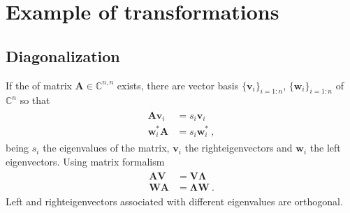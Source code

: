 \documentclass[letterpaper,10pt,english]{jupyterBook}
\begin{document}
\section{Example of transformations}
\label{\detokenize{ch/system-theory/coordinate-transformation:example-of-transformations}}\label{\detokenize{ch/system-theory/coordinate-transformation:system-theory-coordinate-transformation-examples}}

\subsection{Diagonalization}
\label{\detokenize{ch/system-theory/coordinate-transformation:diagonalization}}\label{\detokenize{ch/system-theory/coordinate-transformation:system-theory-coordinate-transformation-examples-diagonalization}}
\sphinxAtStartPar
{} If the  of matrix \(\mathbf{A} \in \mathbb{C}^{n,n}\) exists, there are vector basis \(\{ \mathbf{v}_i \}_{i=1:n}\), \(\{ \mathbf{w}_i \}_{i=1:n}\) of \(\mathbb{C}^n\) so that
\begin{equation*}
\begin{split}\begin{aligned}
  \mathbf{A} \mathbf{v}_i & = s_i \mathbf{v}_i  \\
  \mathbf{w}^*_i \mathbf{A} & = s_i \mathbf{w}^*_i  \ ,
\end{aligned}\end{split}
\end{equation*}
\sphinxAtStartPar
being \(s_i\) the eigenvalues of the matrix, \(\mathbf{v}_i\) the right\sphinxhyphen{}eigenvectors and \(\mathbf{w}_i\) the left eigenvectors. Using matrix formalism
\begin{equation*}
\begin{split}\begin{aligned}
  \mathbf{A} \mathbf{V} & = \mathbf{V} \boldsymbol{\Lambda}  \\
  \mathbf{W} \mathbf{A} & = \boldsymbol{\Lambda} \mathbf{W}  \ .
\end{aligned}\end{split}
\end{equation*}
\sphinxAtStartPar
Left\sphinxhyphen{} and right\sphinxhyphen{}eigenvectors associated with different eigenvalues are orthogonal.
\end{document}
